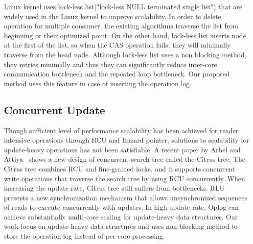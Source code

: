 Linux kernel uses lock-less list("lock-less NULL terminated single
list") that are widely used in the Linux kernel to improve scalability.
In order to delete operation for multiple consumer, the existing
algorithms traverse the list from beginning or their optimized point.
On the other hand, lock-less list inserts node at the first of the list, so when the
CAS operation fails, they will minimally traverse from the head node.
Although lock-less list uses a non blocking method, they retries minimally
and thus they can significantly reduce inter-core communication bottleneck and the repeated
loop bottleneck.
Our proposed method uses this feature in case of inserting the operation log.

\subsection{Concurrent Update}
Though sufficient level of performance scalability has been achieved for 
reader intensive operations through RCU and Hazard pointer, 
solutions to scalability for update-heavy operations has not been satisfiable.
A recent paper by Arbel and Attiya~\cite{Arbel2014ConcurrentRCU} shows a new
design of concurrent search tree called the Citrus tree. The Citrus tree
combines RCU and fine-grained locks, and it supports concurrent write
operations that traverse the search tree by using RCU concurrently.
When increasing the update rate, Citrus tree still suffers from bottlenecks.
RLU~\cite{Matveev2015RLU} presents a new synchronization mechanism that allows
unsynchronized sequences of reads to execute concurrently with updates.
In high update rate, Oplog can achieve substantially multi-core scaling for
update-heavy data structures.
Our work focus on update-heavy data structures and uses non-blocking method to store the operation log instead of per-core
processing.
